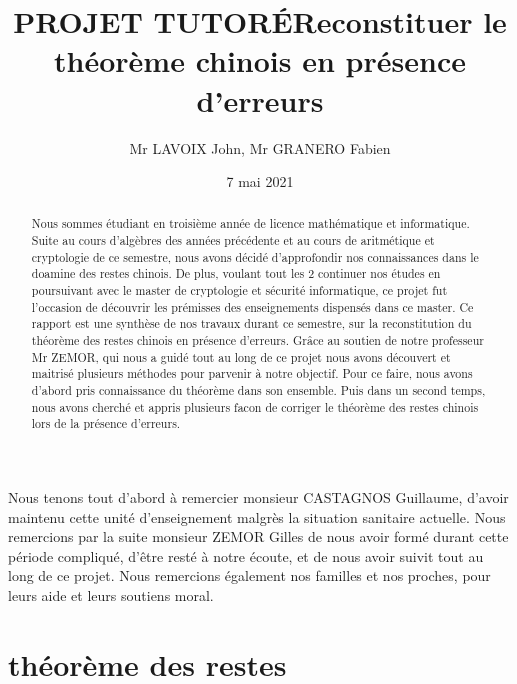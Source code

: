 \documentclass[a4paper, 11pt]{report}
\title{PROJET TUTORÉ\newline Reconstituer le théorème chinois en présence d’erreurs}
\author{Mr LAVOIX John, Mr GRANERO Fabien }
\date{7 mai 2021}
\begin{document}
\maketitle

\begin{abstract}

    Nous sommes étudiant en troisième année de licence mathématique et informatique. Suite au cours d'algèbres des années précédente 
et au cours de aritmétique et cryptologie de ce semestre, nous avons décidé d'approfondir nos connaissances dans le doamine des restes chinois.
De plus, voulant tout les 2 continuer nos études en poursuivant avec le master de cryptologie et sécurité informatique, ce projet fut l'occasion de découvrir les prémisses des enseignements dispensés dans ce master. \newline
\newline
\newline
Ce rapport est  une synthèse de nos travaux durant ce semestre, sur la reconstitution du théorème des restes chinois en présence d'erreurs.
Grâce au soutien de notre professeur Mr ZEMOR, qui nous a guidé tout au long de ce projet nous avons découvert et maitrisé plusieurs méthodes pour parvenir à notre objectif.
Pour ce faire, nous avons d'abord pris connaissance du théorème dans son ensemble. Puis dans un second temps, nous avons cherché et appris plusieurs facon de corriger le théorème des restes chinois lors de la présence d'erreurs.

\end{abstract}


\tableofcontents

\newpage

\begin{flushleft}
    Nous tenons tout d'abord à remercier monsieur CASTAGNOS Guillaume, d'avoir maintenu cette unité d'enseignement malgrès la situation sanitaire actuelle.  
Nous remercions par la suite monsieur ZEMOR Gilles de nous avoir formé durant cette période compliqué, d'être resté à notre écoute, et de nous avoir suivit tout au long de ce projet.
\newline 
Nous remercions également nos familles et nos proches, pour leurs aide et leurs soutiens moral.
\end{flushleft}

\chapter{théorème des restes}
\end{document}
